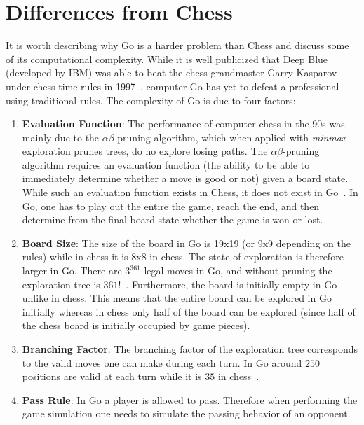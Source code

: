 \documentclass[nocopyrightspace, 10pt]{sigplanconf}
\begin{document}
\section{Differences from Chess}

It is worth describing why Go is a harder problem than Chess and discuss some of its computational complexity. While it is well publicized that Deep Blue (developed by IBM) was able to beat the chess grandmaster Garry Kasparov under chess time rules in 1997~\cite{deepblue}, computer Go has yet to defeat a professional using traditional rules. The complexity of Go is due to four factors:

\begin{enumerate}
\item \textbf{Evaluation Function}: The performance of computer chess in the 90s was mainly due to the $\alpha \beta$-pruning algorithm, which when applied with \textit{minmax} exploration prunes trees, do no explore losing paths. The $\alpha \beta$-pruning algorithm requires an evaluation function (the ability to be able to immediately determine whether a move is good or not) given a board state. While such an evaluation function exists in Chess, it does not exist in Go~\cite{abvs}. In Go, one has to play out the entire the game, reach the end, and then determine from the final board state whether the game is won or lost.
\item \textbf{Board Size}: The size of the board in Go is 19x19 (or 9x9 depending on the rules) while in chess it is 8x8 in chess. The state of exploration is therefore larger in Go. There are $3^{361}$ legal moves in Go, and without pruning the exploration tree is $361!$~\cite{mathgo}. Furthermore, the board is initially empty in Go unlike in chess. This means that the entire board can be explored in Go initially whereas in chess only half of the board can be explored (since half of the chess board is initially occupied by game pieces). 
\item \textbf{Branching Factor}: The branching factor of the exploration tree corresponds to the valid moves one can make during each turn. In Go around $250$ positions are valid at each turn while it is $35$ in chess~\cite{branch}. 
\item \textbf{Pass Rule}: In Go a player is allowed to pass. Therefore when performing the game simulation one needs to simulate the passing behavior of an opponent.
\end{enumerate}
\end{document}
